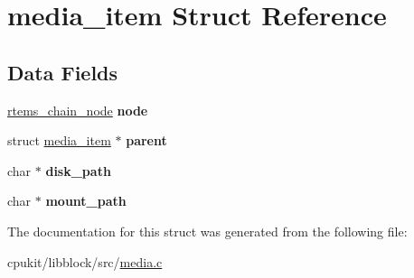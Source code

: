 \hypertarget{structmedia__item}{}\section{media\+\_\+item Struct Reference}
\label{structmedia__item}
\subsection*{Data Fields}
\begin{DoxyCompactItemize}
\item 
\mbox{\label{structmedia__item_ad7204c157f7099b05acaaa9a6aa6d2b4}} 
\mbox{\hyperlink{structChain__Node__struct}{rtems\+\_\+chain\+\_\+node}} {\bfseries node}
\item 
\mbox{\label{structmedia__item_a3842c96d99854aa22fd079f43a083311}} 
struct \mbox{\hyperlink{structmedia__item}{media\+\_\+item}} $\ast$ {\bfseries parent}
\item 
\mbox{\label{structmedia__item_a9a5fe7774089203eb39be02706f11aed}} 
char $\ast$ {\bfseries disk\+\_\+path}
\item 
\mbox{\label{structmedia__item_a7090c344fd269c2e00de748ef770dc32}} 
char $\ast$ {\bfseries mount\+\_\+path}
\end{DoxyCompactItemize}


The documentation for this struct was generated from the following file\+:\begin{DoxyCompactItemize}
\item 
cpukit/libblock/src/\mbox{\hyperlink{media_8c}{media.\+c}}\end{DoxyCompactItemize}
